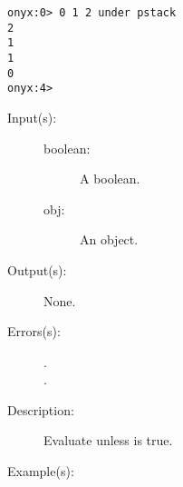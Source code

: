 \begin{description}
\begin{description}
\begin{verbatim}
onyx:0> 0 1 2 under pstack
2
1
1
0
onyx:4>
		\end{verbatim}
	\end{description}
\label{systemdict:unless}
\item[{\onyxop{boolean obj}{unless}{--}}: ]
	\begin{description}\item[]
	\item[Input(s): ]
		\begin{description}\item[]
		\item[boolean: ]
			A boolean.
		\item[obj: ]
			An object.
		\end{description}
	\item[Output(s): ] None.
	\item[Errors(s): ]
		\begin{description}\item[]
		\item[.]
		\item[.]
		\end{description}
	\item[Description: ]
		Evaluate  unless  is true.
	\item[Example(s): ]\begin{verbatim}


\end{verbatim}
\end{description}
\end{description}

